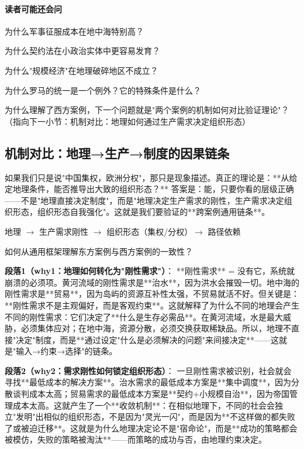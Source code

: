 \documentclass[openany, a4paper, 12pt]{book}
\newenvironment{logicmap}{
	\begin{tcolorbox}[
		colback=blue!5!white,      %
		colframe=blue!50!black,    %
		title=\textbf{逻辑地图 (Logic Map)}, %
		fonttitle=\bfseries,
		sharp corners=south,       %
		boxrule=0.5mm
		]
	\centering
	}{
	\end{tcolorbox}
}
\newenvironment{motivation}{
	\vspace{0.5em}
	\begin{tcolorbox}[
		colback=gray!10,           %
		colframe=gray!60,          %
		title=\textit{本章动机 (Motivation)},
		fonttitle=\bfseries,
		arc=0mm,                   %
		leftrule=3mm               %
		]
		\small \itshape %
	}{
	\end{tcolorbox}
	\vspace{1em}
}
\begin{document}
	\paragraph*{读者可能还会问}
	\item 为什么军事征服成本在地中海特别高？
	\item 为什么契约法在小政治实体中更容易发育？
	\item 为什么"规模经济"在地理破碎地区不成立？
	\item 为什么罗马的统一是一个例外？它的特殊条件是什么？
	\item 为什么理解了西方案例，下一个问题就是"两个案例的机制如何对比验证理论"？（指向下一小节：机制对比：地理如何通过生产需求决定组织形态）
	
	\subsection{机制对比：地理→生产→制度的因果链条}
	
	\begin{motivation}
		如果我们只是说"中国集权，欧洲分权"，那只是现象描述。真正的理论是：**从给定地理条件，能否推导出大致的组织形态？** 答案是：能，只要你看的层级正确——不是"地理直接决定制度"，而是"地理决定生产需求的刚性，生产需求决定组织形态，组织形态自我强化"。这就是我们要验证的**跨案例通用链条**。
	\end{motivation}
	
	\begin{logicmap}
		地理 $\rightarrow$ 生产需求刚性 $\rightarrow$ 组织形态（集权/分权）$\rightarrow$ 路径依赖
	\end{logicmap}
	
	\begin{questionbox}
		如何从通用框架理解东方案例与西方案例的一致性？
	\end{questionbox}
	
	\textbf{段落1（why1：地理如何转化为"刚性需求"）}：  
	**刚性需求** = 没有它，系统就崩溃的必须项。黄河流域的刚性需求是**治水**，因为洪水会摧毁一切。地中海的刚性需求是**贸易**，因为岛屿的资源互补性太强，不贸易就活不好。但关键是：**刚性需求不是主观偏好，而是客观约束**。这就解释了为什么不同的地理会产生不同的刚性需求：它们决定了**什么是生存必需品**。在黄河流域，水是最大威胁，必须集体应对；在地中海，资源分散，必须交换获取稀缺品。所以，地理不直接"决定"制度，而是**通过设定"什么是必须解决的问题"来间接决定**——这就是"输入→约束→选择"的链条。
	
	\textbf{段落2（why2：需求刚性如何锁定组织形态）}：  
	一旦刚性需求被识别，社会就会寻找**最低成本的解决方案**。治水需求的最低成本方案是**集中调度**，因为分散谈判成本太高；贸易需求的最低成本方案是**契约+小规模自治**，因为帝国管理成本太高。这就产生了一个**收敛机制**：在相似地理下，不同的社会会独立"发明"出相似的组织形态，不是因为"灵光一闪"，而是因为**不这样做的都失败了或被迫迁移**。这就是为什么地理决定论不是"宿命论"，而是**成功的策略都会被模仿，失败的策略被淘汰**——而策略的成功与否，由地理约束决定。
	
\end{document}
